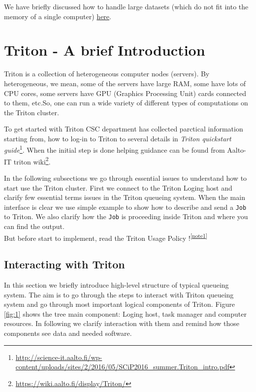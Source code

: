 \documentclass[a4paper,11pt]{article}
\begin{document}
We have briefly discussed how to handle large datasets (which do not fit into the memory of a single computer) \hyperref[bigdata]{here}.
\section{Triton - A brief Introduction}

Triton is a collection of heterogeneous computer nodes (servers). By 
heterogeneous, we mean, some of the servers have large RAM, some have lots of CPU cores, some servers have GPU (Graphics Processing Unit) cards connected to 
them, etc.So, one can run a wide variety of different types of computations on the Triton cluster. 

To get started with Triton CSC department has collected parctical information starting from, how to log-in to Triton to several details in  \textit{Triton quickstart guide}\footnote{\url{http://science-it.aalto.fi/wp-content/uploads/sites/2/2016/05/SCiP2016\_summer.Triton\_intro.pdf}}. When the initial step is done helping guidance can be found from Aalto-IT triton wiki\footnote{\url{https://wiki.aalto.fi/display/Triton/}}. 

In the following subsections we go through essential issues to understand how to start use the Triton cluster. First we connect to the Triton Loging host and clarify few essential terms issues in the Triton queueing system. When the main interface is clear we use simple example to show how to describe and send a  \texttt{Job} to Triton. We also clarify how the \texttt{Job} is proceeding inside Triton and where you can find the output. \\
But before start to implement, read the Triton Usage Policy !\textsuperscript{\ref{note1}}%

\subsection{Interacting with Triton}
In this section we briefly introduce high-level structure of typical queueing system. The aim is to go through the steps to interact with Triton queueing system and go through most important logical components of Triton. Figure \ref{fig:1} shows the tree main component: Loging host, task manager and computer resources. In following we clarify interaction with them and remind how those components see data and needed software. 
\end{document}
